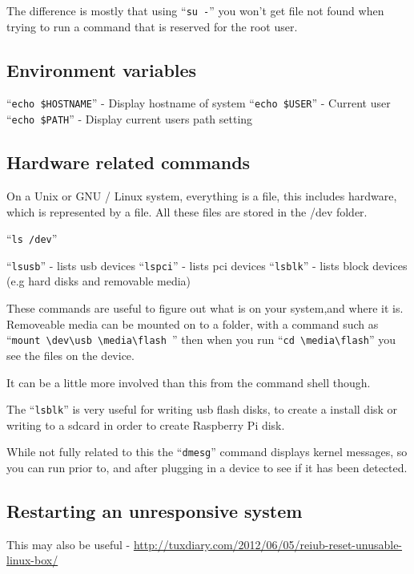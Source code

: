 \documentclass{extbook}
\begin{document}
The difference is mostly that using ``\verb|su -|'' you won't get file not found when trying to run a command that is reserved for the root user. 

\subsection{Environment variables}

``\verb|echo $HOSTNAME|'' - Display hostname of system
``\verb|echo $USER|'' - Current user
``\verb|echo $PATH|'' - Display current users path setting

\subsection{Hardware related commands}

On a Unix or GNU / Linux system, everything is a file,  this includes hardware, which is represented by a file. All these files are stored in the /dev folder.

``\verb|ls /dev|''

``\verb|lsusb|'' - lists usb devices
``\verb|lspci|'' - lists pci devices
``\verb|lsblk|'' - lists block devices (e.g hard disks and removable media)

These commands are useful to figure out what is on your system,and where it is.  Removeable media can be mounted on to a folder, with a command such as ``\verb|mount \dev\usb \media\flash |''  then when you run ``\verb|cd \media\flash|'' you see the files on the device.

It can be a little more involved than this from the command shell though. 

The ``\verb|lsblk|'' is very useful for writing usb flash disks, to create a install disk or writing to a sdcard in order to create Raspberry Pi disk.

While not fully related to this the ``\verb|dmesg|'' command displays kernel messages,  so you can run prior to, and after plugging in a device to see if it has been detected. 
 
\subsection{Restarting an unresponsive system}

This may also be useful - \url{http://tuxdiary.com/2012/06/05/reiub-reset-unusable-linux-box/}

\
\end{document}
